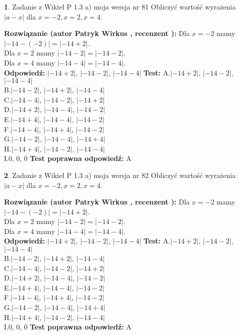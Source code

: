 \documentclass[12pt, a4paper]{article}
\theoremstyle{definition} %
\newtheorem{zad}{}
\newcommand{\zadStart}[1]{\begin{zad}#1\newline}
\newcommand{\zadStop}{\end{zad}}
\newcommand{\rozwStart}[2]{\noindent \textbf{Rozwiązanie (autor #1 , recenzent #2): }\newline}
\newcommand{\rozwStop}{\newline}
\newcommand{\odpStart}{\noindent \textbf{Odpowiedź:}\newline}
\newcommand{\odpStop}{\newline}
\newcommand{\testStart}{\noindent \textbf{Test:}\newline}
\newcommand{\testStop}{\newline}
\newcommand{\kluczStart}{\noindent \textbf{Test poprawna odpowiedź:}\newline}
\newcommand{\kluczStop}{\newline}
\begin{document}
\zadStart{Zadanie z Wikieł P 1.3 a) moja wersja nr 81}
Obliczyć wartość wyrażenia $|a - x|$ dla $x=-2,x=2,x=4$.
\zadStop
\rozwStart{Patryk Wirkus}{}
Dla $x = -2$ mamy $|-14 - (-2)| = |-14 + 2|$.\\
Dla $x = 2$ mamy $|-14 - 2| = |-14 - 2|$.\\
Dla $x = 4$ mamy $|-14 - 4| = |-14 - 4|$.\\
\rozwStop
\odpStart
$|-14 + 2|$, $|-14 - 2|$, $|-14 - 4|$
\odpStop
\testStart
A.$|-14 + 2|$, $|-14 - 2|$, $|-14 - 4|$\\
B.$|-14 - 2|$, $|-14 + 2|$, $|-14 - 4|$\\
C.$|-14 - 4|$, $|-14 - 2|$, $|-14 + 2|$\\
D.$|-14 + 2|$, $|-14 - 4|$, $|-14 - 2|$\\
E.$|-14 + 4|$, $|-14 - 4|$, $|-14 - 2|$\\
F.$|-14 - 4|$, $|-14 + 4|$, $|-14 - 2|$\\
G.$|-14 - 2|$, $|-14 - 4|$, $|-14 + 4|$\\
H.$|-14 + 4|$, $|-14 - 2|$, $|-14 - 4|$\\
I.$0$, $0$, $0$
\testStop
\kluczStart
A
\kluczStop



\zadStart{Zadanie z Wikieł P 1.3 a) moja wersja nr 82}
Obliczyć wartość wyrażenia $|a - x|$ dla $x=-2,x=2,x=4$.
\zadStop
\rozwStart{Patryk Wirkus}{}
Dla $x = -2$ mamy $|-14 - (-2)| = |-14 + 2|$.\\
Dla $x = 2$ mamy $|-14 - 2| = |-14 - 2|$.\\
Dla $x = 4$ mamy $|-14 - 4| = |-14 - 4|$.\\
\rozwStop
\odpStart
$|-14 + 2|$, $|-14 - 2|$, $|-14 - 4|$
\odpStop
\testStart
A.$|-14 + 2|$, $|-14 - 2|$, $|-14 - 4|$\\
B.$|-14 - 2|$, $|-14 + 2|$, $|-14 - 4|$\\
C.$|-14 - 4|$, $|-14 - 2|$, $|-14 + 2|$\\
D.$|-14 + 2|$, $|-14 - 4|$, $|-14 - 2|$\\
E.$|-14 + 4|$, $|-14 - 4|$, $|-14 - 2|$\\
F.$|-14 - 4|$, $|-14 + 4|$, $|-14 - 2|$\\
G.$|-14 - 2|$, $|-14 - 4|$, $|-14 + 4|$\\
H.$|-14 + 4|$, $|-14 - 2|$, $|-14 - 4|$\\
I.$0$, $0$, $0$
\testStop
\kluczStart
A
\kluczStop
\end{document}
